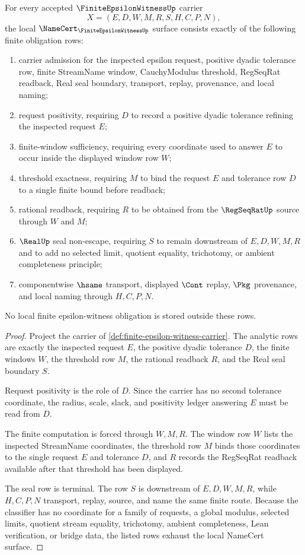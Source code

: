 \begin{theorem}
\label{thm:finite-epsilon-witness-namecert-obligations}
For every accepted $\FiniteEpsilonWitnessUp$ carrier
$$
X=(E,D,W,M,R,S,H,C,P,N),
$$
the local $\NameCert_{\FiniteEpsilonWitnessUp}$ surface consists exactly of the following finite obligation rows:
\begin{enumerate}
\item carrier admission for the inspected epsilon request, positive dyadic tolerance row, finite StreamName window, CauchyModulus threshold, RegSeqRat readback, Real seal boundary, transport, replay, provenance, and local naming;
\item request positivity, requiring $D$ to record a positive dyadic tolerance refining the inspected request $E$;
\item finite-window sufficiency, requiring every coordinate used to answer $E$ to occur inside the displayed window row $W$;
\item threshold exactness, requiring $M$ to bind the request $E$ and tolerance row $D$ to a single finite bound before readback;
\item rational readback, requiring $R$ to be obtained from the $\RegSeqRatUp$ source through $W$ and $M$;
\item $\RealUp$ seal non-escape, requiring $S$ to remain downstream of $E,D,W,M,R$ and to add no selected limit, quotient equality, trichotomy, or ambient completeness principle;
\item componentwise $\hsame$ transport, displayed $\Cont$ replay, $\Pkg$ provenance, and local naming through $H,C,P,N$.
\end{enumerate}
No local finite epsilon-witness obligation is stored outside these rows.
\end{theorem}
\begin{proof}
Project the carrier of \autoref{def:finite-epsilon-witness-carrier}. The analytic rows are exactly the inspected request $E$, the positive dyadic tolerance $D$, the finite windows $W$, the threshold row $M$, the rational readback $R$, and the Real seal boundary $S$.

Request positivity is the role of $D$. Since the carrier has no second tolerance coordinate, the radius, scale, slack, and positivity ledger answering $E$ must be read from $D$.

The finite computation is forced through $W,M,R$. The window row $W$ lists the inspected StreamName coordinates, the threshold row $M$ binds those coordinates to the single request $E$ and tolerance $D$, and $R$ records the RegSeqRat readback available after that threshold has been displayed.

The seal row is terminal. The row $S$ is downstream of $E,D,W,M,R$, while $H,C,P,N$ transport, replay, source, and name the same finite route. Because the classifier has no coordinate for a family of requests, a global modulus, selected limits, quotient stream equality, trichotomy, ambient completeness, Lean verification, or bridge data, the listed rows exhaust the local NameCert surface.
\end{proof}

